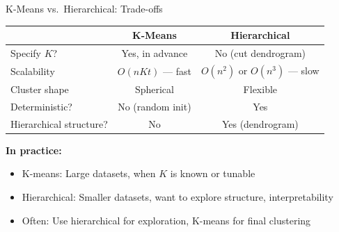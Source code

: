 \documentclass[10pt]{beamer}
\begin{document}
\begin{frame}{K-Means vs.\ Hierarchical: Trade-offs}

  \begin{center}
  \begin{tabular}{lcc}
    \toprule
    & \textbf{K-Means} & \textbf{Hierarchical} \\
    \midrule
    Specify $K$? & Yes, in advance & No (cut dendrogram) \\
    \addlinespace
    Scalability & $O(nKt)$ --- fast & $O(n^2)$ or $O(n^3)$ --- slow \\
    \addlinespace
    Cluster shape & Spherical & Flexible \\
    \addlinespace
    Deterministic? & No (random init) & Yes \\
    \addlinespace
    Hierarchical structure? & No & Yes (dendrogram) \\
    \bottomrule
  \end{tabular}
  \end{center}

  \vspace{1em}
  \textbf{In practice:}
  \begin{itemize}
    \item K-means: Large datasets, when $K$ is known or tunable
    \item Hierarchical: Smaller datasets, want to explore structure, interpretability
    \item Often: Use hierarchical for exploration, K-means for final clustering
  \end{itemize}
\end{frame}

\end{document}
